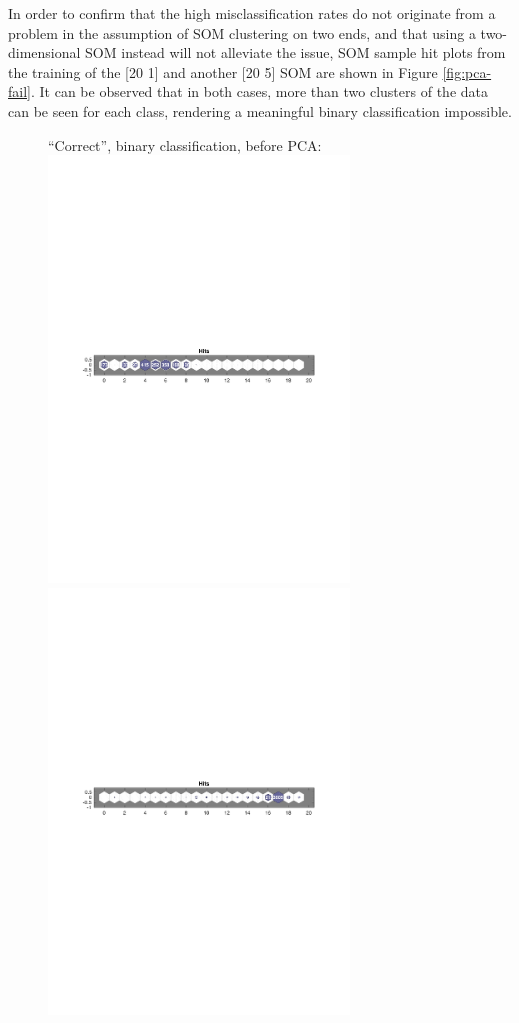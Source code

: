 \documentclass[10pt, oneside]{article}
\begin{document}
In order to confirm that the high misclassification rates do not originate from a problem in the assumption of SOM clustering on two ends, and that using a two-dimensional SOM instead will not alleviate the issue, SOM sample hit plots from the training of the [20 1] and another [20 5] SOM are shown in Figure \ref{fig:pca-fail}. It can be observed that in both cases, more than two clusters of the data can be seen for each class, rendering a meaningful binary classification impossible.

\begin{figure}[h]
\begin{center}
``Correct'', binary classification, before PCA:\\
\includegraphics[width=8cm]{nopca-ones.pdf} \includegraphics[width=8cm]{nopca-zeros.pdf}\\

\end{center}
\end{figure}
\end{document}
